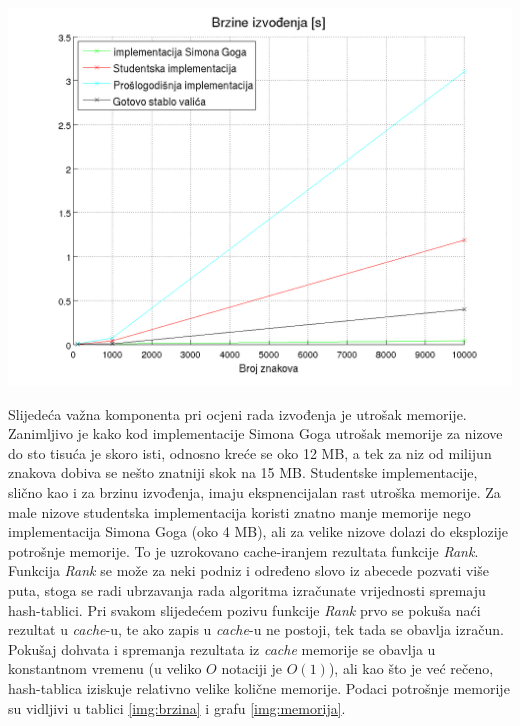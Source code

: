 \documentclass[times, utf8, seminar, numeric]{fer}
\begin{document}
\begin{center}
	\includegraphics[scale=0.8]{slike/odlican_speed.png}
	\label{img:brzina}
\end{center}

Slijedeća važna komponenta pri ocjeni rada izvođenja je utrošak memorije. Zanimljivo je kako kod implementacije Simona Goga utrošak memorije za nizove do sto tisuća je skoro isti, odnosno kreće se oko 12 MB, a tek za niz od milijun znakova dobiva se nešto znatniji skok na 15 MB. Studentske implementacije, slično kao i za brzinu izvođenja, imaju ekspnencijalan rast utroška memorije. Za male nizove studentska implementacija koristi znatno manje memorije nego implementacija Simona Goga (oko 4 MB), ali za velike nizove dolazi do eksplozije potrošnje memorije. To je uzrokovano cache-iranjem rezultata funkcije \textit{Rank}. Funkcija \textit{Rank} se  može za neki podniz i određeno slovo iz abecede pozvati više puta, stoga se radi ubrzavanja rada algoritma izračunate vrijednosti spremaju hash-tablici. Pri svakom slijedećem pozivu funkcije \textit{Rank} prvo se pokuša naći rezultat u \textit{cache}-u, te ako zapis u \textit{cache}-u ne postoji, tek tada se obavlja izračun. Pokušaj dohvata i spremanja rezultata iz \textit{cache} memorije se obavlja u konstantnom vremenu (u veliko $O$ notaciji je $O(1)$), ali kao što je već rečeno, hash-tablica iziskuje relativno velike količne memorije. Podaci potrošnje memorije su vidljivi u tablici \ref{img:brzina} i grafu \ref{img:memorija}. 
\end{document}
